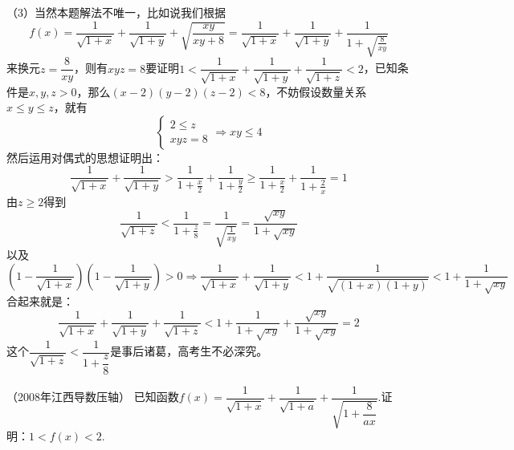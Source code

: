 \begin{solution}
\noindent（3）当然本题解法不唯一，比如说我们根据
\[f \left( x \right)= \frac{1}{ \sqrt{1+x}}+ \frac{1}{ \sqrt{1+y}}+ \sqrt{ \frac{xy}{xy+8}}=\frac{1}{ \sqrt{1+x}}+ \frac{1}{\sqrt{1+y}}+ \frac{1}{1+\sqrt{\frac{8}{xy}}}\]
来换元$z=\dfrac{8}{xy}$，则有$xyz=8$要证明$ 1<\dfrac{1}{ \sqrt{1+x}}+ \dfrac{1}{ \sqrt{1+y}}+ \dfrac{1}{\sqrt{1+z}}<2$，已知条件是$x,y,z>0$，那么$(x-2)(y-2)(z-2)<8$，不妨假设数量关系$x\leq y\leq z$，就有
\[\begin{cases}2\leq z\\xyz=8\end{cases}\Rightarrow xy\leq 4\]
然后运用对偶式的思想证明出：\[
\frac{1}{\sqrt{1+x}}+\frac{1}{\sqrt{1+y}}>\frac{1}{1+\frac{x}{2}}+\frac{1}{1+\frac{y}{2}}\geq\frac{1}{1+\frac{x}{2}}+\frac{1}{1+\frac{2}{x}}=1
\]
由$z\geq 2$得到\[\frac{1}{\sqrt{1+z}}<\frac{1}{1+\frac{z}{8}}=\frac{1}{\sqrt{\frac{1}{xy}}}=\frac{\sqrt{xy}}{1+\sqrt{xy}}\]
以及\[(1-\frac{1}{\sqrt{1+x}})(1-\frac{1}{\sqrt{1+y}})>0\Rightarrow \frac{1}{\sqrt{1+x}}+\frac{1}{\sqrt{1+y}}<1+\frac{1}{\sqrt{(1+x)(1+y)}}<1+\frac{1}{1+\sqrt{xy}}\]
合起来就是：
\[\dfrac{1}{ \sqrt{1+x}}+ \dfrac{1}{ \sqrt{1+y}}+ \dfrac{1}{\sqrt{1+z}}<1+\frac{1}{1+\sqrt{xy}}+\frac{\sqrt{xy}}{1+\sqrt{xy}}=2\]
这个$\dfrac{1}{\sqrt{1+z}}<\dfrac{1}{1+\dfrac{z}{8}}$是事后诸葛，高考生不必深究。
\end{solution}
\begin{example}{（2008年江西导数压轴）}{}
已知函数$f \left( x \right)= \dfrac{1}{ \sqrt{1+x}}+ \dfrac{1}{ \sqrt{1+a}}+ \dfrac{1}{ \sqrt{1+ \dfrac{8}{ax}}}.$证明：$1<f(x)<2.$
\end{example}
